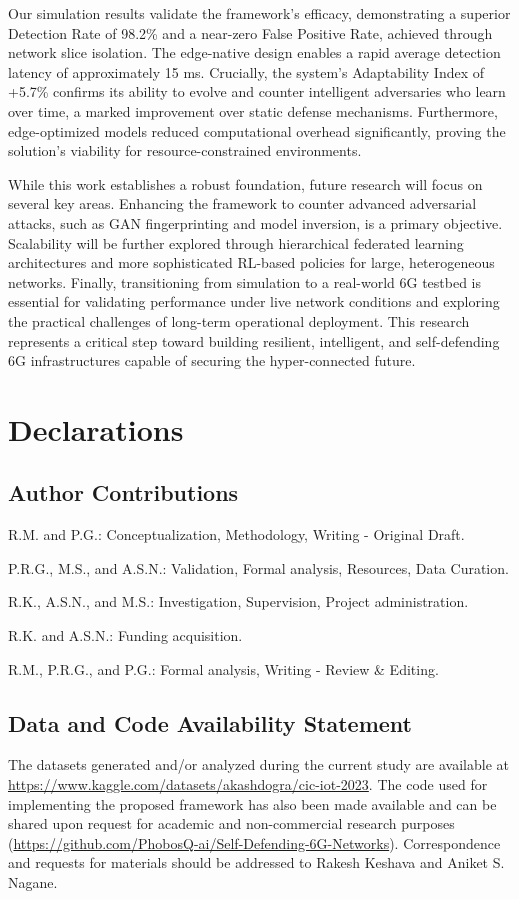 \documentclass{article}
\begin{document}
Our simulation results validate the framework's efficacy, demonstrating a superior Detection Rate of 98.2\% and a near-zero False Positive Rate, achieved through network slice isolation. The edge-native design enables a rapid average detection latency of approximately 15 ms. Crucially, the system's Adaptability Index of +5.7\% confirms its ability to evolve and counter intelligent adversaries who learn over time, a marked improvement over static defense mechanisms. Furthermore, edge-optimized models reduced computational overhead significantly, proving the solution's viability for resource-constrained environments.

While this work establishes a robust foundation, future research will focus on several key areas. Enhancing the framework to counter advanced adversarial attacks, such as GAN fingerprinting and model inversion, is a primary objective. Scalability will be further explored through hierarchical federated learning architectures and more sophisticated RL-based policies for large, heterogeneous networks. Finally, transitioning from simulation to a real-world 6G testbed is essential for validating performance under live network conditions and exploring the practical challenges of long-term operational deployment. This research represents a critical step toward building resilient, intelligent, and self-defending 6G infrastructures capable of securing the hyper-connected future.

\section*{Declarations}

\subsection*{Author Contributions}
R.M. and P.G.: Conceptualization, Methodology, Writing - Original Draft.

P.R.G., M.S., and A.S.N.: Validation, Formal analysis, Resources, Data Curation.

R.K., A.S.N., and M.S.: Investigation, Supervision, Project administration.

R.K. and A.S.N.: Funding acquisition.

R.M., P.R.G., and P.G.: Formal analysis, Writing - Review \& Editing.


\subsection*{Data and Code Availability Statement}
The datasets generated and/or analyzed during the current study are available at \url{https://www.kaggle.com/datasets/akashdogra/cic-iot-2023}. The code used for implementing the proposed framework has also been made available and can be shared upon request for academic and non-commercial research purposes (\url{https://github.com/PhobosQ-ai/Self-Defending-6G-Networks}). Correspondence and requests for materials should be addressed to Rakesh Keshava and Aniket S. Nagane.
\end{document}

